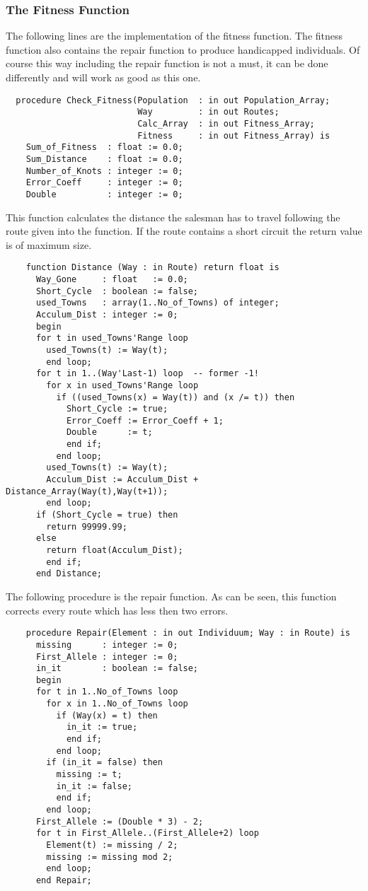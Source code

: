 \subsubsection{The Fitness Function}
The following lines are the implementation of the fitness function. The fitness
function also contains the repair function to produce handicapped individuals.
Of course this way including the repair function is not a must, it can be done
differently and will work as good as this one.
\begin{verbatim}
  procedure Check_Fitness(Population  : in out Population_Array;
                          Way         : in out Routes;
                          Calc_Array  : in out Fitness_Array;
                          Fitness     : in out Fitness_Array) is
    Sum_of_Fitness  : float := 0.0;
    Sum_Distance    : float := 0.0;
    Number_of_Knots : integer := 0;
    Error_Coeff     : integer := 0;
    Double          : integer := 0;
\end{verbatim}
This function calculates the distance the salesman has to travel following the
route given into the function. If the route contains a short circuit the return
value is of maximum size.
\begin{verbatim}
    function Distance (Way : in Route) return float is
      Way_Gone     : float   := 0.0;
      Short_Cycle  : boolean := false;
      used_Towns   : array(1..No_of_Towns) of integer;
      Acculum_Dist : integer := 0;
      begin
      for t in used_Towns'Range loop
        used_Towns(t) := Way(t);
        end loop;
      for t in 1..(Way'Last-1) loop  -- former -1!
        for x in used_Towns'Range loop
          if ((used_Towns(x) = Way(t)) and (x /= t)) then
            Short_Cycle := true;
            Error_Coeff := Error_Coeff + 1;
            Double      := t;
            end if;
          end loop;
        used_Towns(t) := Way(t);
        Acculum_Dist := Acculum_Dist + Distance_Array(Way(t),Way(t+1));
        end loop;
      if (Short_Cycle = true) then
        return 99999.99;
      else
        return float(Acculum_Dist);
        end if;
      end Distance;
\end{verbatim}
The following procedure is the repair function. As can be seen, this function
corrects every route which has less then two errors.
\begin{verbatim}
    procedure Repair(Element : in out Individuum; Way : in Route) is
      missing      : integer := 0;
      First_Allele : integer := 0;
      in_it        : boolean := false;
      begin
      for t in 1..No_of_Towns loop
        for x in 1..No_of_Towns loop
          if (Way(x) = t) then
            in_it := true;
            end if;
          end loop;
        if (in_it = false) then
          missing := t;
          in_it := false;
          end if;
        end loop;
      First_Allele := (Double * 3) - 2;
      for t in First_Allele..(First_Allele+2) loop
        Element(t) := missing / 2;
        missing := missing mod 2;
        end loop;
      end Repair;
\end{verbatim}

